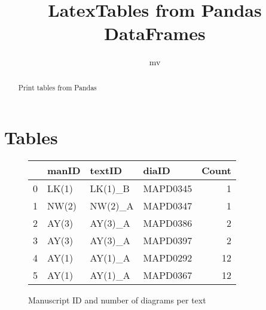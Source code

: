 \documentclass[a4paper,11pt]{article}
\title{LatexTables from Pandas DataFrames}
\author{mv}
\begin{document}
\maketitle
\tableofcontents

\begin{abstract}
Print tables from Pandas  
\end{abstract}

\section{Tables}

\begin{figure}
\centering
\begin{tabular}{llllr}
\toprule
{} &  manID &   textID &     diaID &  Count \\
\midrule
0 &  LK(1) &  LK(1)\_B &  MAPD0345 &      1 \\
1 &  NW(2) &  NW(2)\_A &  MAPD0347 &      1 \\
2 &  AY(3) &  AY(3)\_A &  MAPD0386 &      2 \\
3 &  AY(3) &  AY(3)\_A &  MAPD0397 &      2 \\
4 &  AY(1) &  AY(1)\_A &  MAPD0292 &     12 \\
5 &  AY(1) &  AY(1)\_A &  MAPD0367 &     12 \\
\bottomrule
\end{tabular}
\caption{Manuscript ID and number of diagrams per text}
\end{figure}
\end{document}

